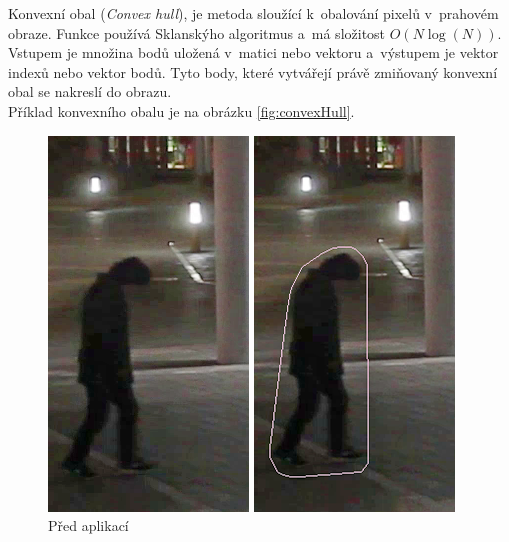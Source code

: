 Konvexní obal (\textit{Convex hull}), je metoda sloužící k~obalování pixelů v~prahovém obraze. Funkce používá Sklanskýho algoritmus \cite{openCV:sklansky} a~má složitost  $O(N \log(N))$.  Vstupem je množina bodů uložená v~matici nebo vektoru a~výstupem je vektor indexů nebo vektor bodů. Tyto body, které vytvářejí právě zmiňovaný konvexní obal se nakreslí do obrazu. \\
Příklad konvexního obalu je na obrázku \ref{fig:convexHull}.
\begin{figure}[H]
\centering
\begin{minipage}{.5\textwidth}
  \centering
  \includegraphics[width=.5\linewidth]{figures/Hull_Original}
  \caption*{Před aplikací}
  \label{fig:original}
\end{minipage}%
\begin{minipage}{.5\textwidth}
  \centering
  \includegraphics[width=.5\linewidth]{figures/Hull_Result}

\end{minipage}
\end{figure}
